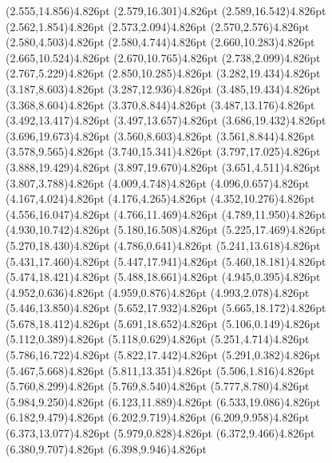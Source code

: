 \documentclass[10pt]{article}
\begin{document}
{{\qdisk(2.555,14.856){4.826pt}%
\qdisk(2.579,16.301){4.826pt}%
\qdisk(2.589,16.542){4.826pt}%
\qdisk(2.562,1.854){4.826pt}%
\qdisk(2.573,2.094){4.826pt}%
\qdisk(2.570,2.576){4.826pt}%
\qdisk(2.580,4.503){4.826pt}%
\qdisk(2.580,4.744){4.826pt}%
\qdisk(2.660,10.283){4.826pt}%
\qdisk(2.665,10.524){4.826pt}%
\qdisk(2.670,10.765){4.826pt}%
\qdisk(2.738,2.099){4.826pt}%
\qdisk(2.767,5.229){4.826pt}%
\qdisk(2.850,10.285){4.826pt}%
\qdisk(3.282,19.434){4.826pt}%
\qdisk(3.187,8.603){4.826pt}%
\qdisk(3.287,12.936){4.826pt}%
\qdisk(3.485,19.434){4.826pt}%
\qdisk(3.368,8.604){4.826pt}%
\qdisk(3.370,8.844){4.826pt}%
\qdisk(3.487,13.176){4.826pt}%
\qdisk(3.492,13.417){4.826pt}%
\qdisk(3.497,13.657){4.826pt}%
\qdisk(3.686,19.432){4.826pt}%
\qdisk(3.696,19.673){4.826pt}%
\qdisk(3.560,8.603){4.826pt}%
\qdisk(3.561,8.844){4.826pt}%
\qdisk(3.578,9.565){4.826pt}%
\qdisk(3.740,15.341){4.826pt}%
\qdisk(3.797,17.025){4.826pt}%
\qdisk(3.888,19.429){4.826pt}%
\qdisk(3.897,19.670){4.826pt}%
\qdisk(3.651,4.511){4.826pt}%
\qdisk(3.807,3.788){4.826pt}%
\qdisk(4.009,4.748){4.826pt}%
\qdisk(4.096,0.657){4.826pt}%
\qdisk(4.167,4.024){4.826pt}%
\qdisk(4.176,4.265){4.826pt}%
\qdisk(4.352,10.276){4.826pt}%
\qdisk(4.556,16.047){4.826pt}%
\qdisk(4.766,11.469){4.826pt}%
\qdisk(4.789,11.950){4.826pt}%
\qdisk(4.930,10.742){4.826pt}%
\qdisk(5.180,16.508){4.826pt}%
\qdisk(5.225,17.469){4.826pt}%
\qdisk(5.270,18.430){4.826pt}%
\qdisk(4.786,0.641){4.826pt}%
\qdisk(5.241,13.618){4.826pt}%
\qdisk(5.431,17.460){4.826pt}%
\qdisk(5.447,17.941){4.826pt}%
\qdisk(5.460,18.181){4.826pt}%
\qdisk(5.474,18.421){4.826pt}%
\qdisk(5.488,18.661){4.826pt}%
\qdisk(4.945,0.395){4.826pt}%
\qdisk(4.952,0.636){4.826pt}%
\qdisk(4.959,0.876){4.826pt}%
\qdisk(4.993,2.078){4.826pt}%
\qdisk(5.446,13.850){4.826pt}%
\qdisk(5.652,17.932){4.826pt}%
\qdisk(5.665,18.172){4.826pt}%
\qdisk(5.678,18.412){4.826pt}%
\qdisk(5.691,18.652){4.826pt}%
\qdisk(5.106,0.149){4.826pt}%
\qdisk(5.112,0.389){4.826pt}%
\qdisk(5.118,0.629){4.826pt}%
\qdisk(5.251,4.714){4.826pt}%
\qdisk(5.786,16.722){4.826pt}%
\qdisk(5.822,17.442){4.826pt}%
\qdisk(5.291,0.382){4.826pt}%
\qdisk(5.467,5.668){4.826pt}%
\qdisk(5.811,13.351){4.826pt}%
\qdisk(5.506,1.816){4.826pt}%
\qdisk(5.760,8.299){4.826pt}%
\qdisk(5.769,8.540){4.826pt}%
\qdisk(5.777,8.780){4.826pt}%
\qdisk(5.984,9.250){4.826pt}%
\qdisk(6.123,11.889){4.826pt}%
\qdisk(6.533,19.086){4.826pt}%
\qdisk(6.182,9.479){4.826pt}%
\qdisk(6.202,9.719){4.826pt}%
\qdisk(6.209,9.958){4.826pt}%
\qdisk(6.373,13.077){4.826pt}%
\qdisk(5.979,0.828){4.826pt}%
\qdisk(6.372,9.466){4.826pt}%
\qdisk(6.380,9.707){4.826pt}%
\qdisk(6.398,9.946){4.826pt}%
}}
\end{document}
